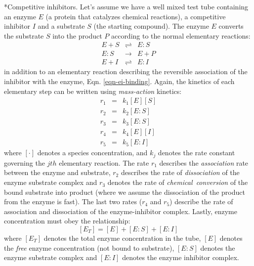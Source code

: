 \documentclass[11pt]{article}
\makeatletter
\theoremstyle{definition}
\renewcommand\subsubsection{\@startsection
	{subsubsection}{2}{0mm}
	{-0.05in}
	{-0.5\baselineskip}
	{\normalfont\normalsize\itshape}}
\makeatother
\begin{document}
\subsubsection*{Competitive inhibitors.}
Let's assume we have a well mixed test tube containing an enzyme $E$ (a protein that catalyzes chemical reactions), a competitive inhibitor $I$
and a substrate $S$ (the starting compound).
The enzyme $E$ converts the substrate $S$ into the product $P$ according to the normal elementary reactions:
\begin{eqnarray}
	E+S&\rightleftharpoons&{E:S}\\
	{E:S}&\longrightarrow&E+P\\\label{eqn-ei-binding}
	E+I&\rightleftharpoons&{E:I}
\end{eqnarray}in addition to an elementary reaction describing the reversible association of the inhibitor with the enzyme, Eqn. \eqref{eqn-ei-binding}.
Again, the kinetics of each elementary step can be written using \emph{mass-action} kinetics:
\begin{eqnarray}
	r_{1} & = & k_{1}\left[E\right]\left[S\right]\\
	r_{2} & = & k_{2}\left[E:S\right]\\
	r_{3} & = & k_{3}\left[E:S\right]\\
	r_{4} & = & k_{4}\left[E\right]\left[I\right]\\
	r_{5} & = & k_{5}\left[E:I\right]
\end{eqnarray}where $\left[\cdot\right]$ denotes a species concentration, and $k_{j}$ denotes the rate constant governing the $jth$ elementary reaction.
The rate $r_{1}$ describes the \emph{association} rate between the enzyme and substrate, $r_{2}$ describes the rate of \emph{dissociation} of the enzyme substrate complex and $r_{3}$ denotes the rate of \emph{chemical~conversion} of the bound substrate into product (where we assume the dissociation of the product from the enzyme is fast).
The last two rates ($r_{4}$ and $r_{5}$) describe the rate of association and dissociation of the enzyme-inhibitor complex.
Lastly, enzyme concentration must obey the relationship:
\begin{equation}\label{eqn:total-enzyme-balance}
	\left[E_{T}\right] = \left[E\right] + \left[E:S\right] + \left[E:I\right]
\end{equation}where $\left[E_{T}\right]$ denotes the total enzyme concentration in the tube, $\left[E\right]$ denotes the \emph{free} enzyme concentration (not bound to substrate), $\left[E:S\right]$ denotes the enzyme substrate complex and $\left[E:I\right]$ denotes the enzyme inhibitor complex.
\end{document}
